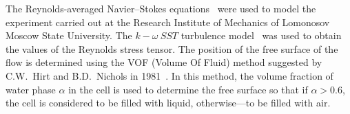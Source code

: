 \documentclass[mathematics,article,accept,pdftex,moreauthors]{Definitions/mdpi}
\begin{document}
The Reynolds-averaged Navier--Stokes equations~\cite{Wilcox2006, Hirsch2007,FerzigerPeric2002} were used to model the experiment carried out at the Research Institute of Mechanics of Lomonosov Moscow State University. The $k-\omega\ SST$ turbulence model~\cite{Menter1993, Menter1994} was used to obtain the values of the Reynolds stress tensor. The position of the free surface of the flow is determined using the VOF (Volume Of Fluid) method suggested by C.W.~Hirt and B.D.~Nichols in 1981~\cite{Hirt1981}. In this method, the volume fraction of water phase $\alpha$ in the cell is used to determine the free surface so that if $\alpha>0.6$, the cell is considered to be filled with liquid, otherwise---to be filled with air.
\end{document}
